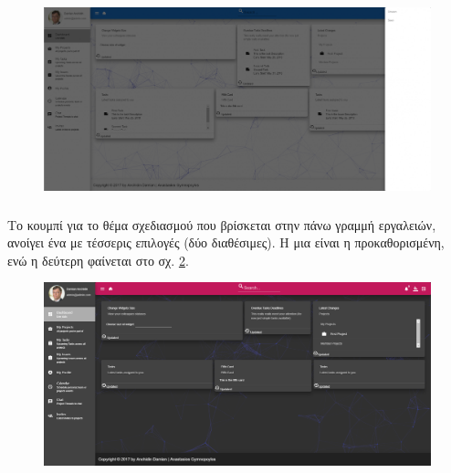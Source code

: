 \begin{figure}[!htb]
\includegraphics[width=\linewidth]{images/userNotifications.png}
\caption{}
\label{fig:userNotifications}
\end{figure}

\subsubsection*{}
\pSpace Το κουμπί για το θέμα σχεδιασμού που βρίσκεται στην πάνω γραμμή εργαλειών, ανοίγει ένα  με τέσσερις επιλογές (δύο διαθέσιμες). Η μια είναι η προκαθορισμένη, ενώ η δεύτερη φαίνεται στο σχ. \ref{fig:userDashboardDark}.

\begin{figure}[!htb]
\includegraphics[width=\linewidth]{images/userDashboardTHEME2.png}
\caption{}
\label{fig:userDashboardDark}
\end{figure}

